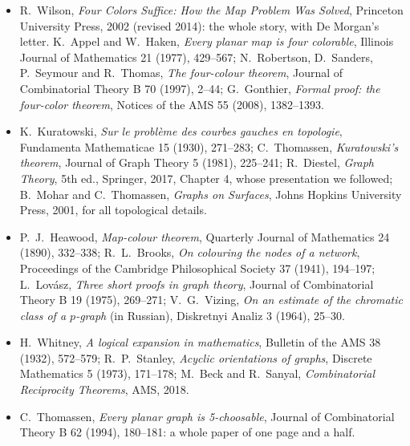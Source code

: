 \begin{itemize}
\item R.~Wilson, \emph{Four Colors Suffice: How the Map Problem Was Solved}, Princeton University Press, 2002 (revised 2014): the whole story,
with De Morgan's letter. K.~Appel and W.~Haken, \emph{Every planar map is four colorable}, Illinois Journal of Mathematics 21 (1977), 429--567;
N.~Robertson, D.~Sanders, P.~Seymour and R.~Thomas, \emph{The four-colour theorem}, Journal of Combinatorial Theory B 70 (1997), 2--44; G.~Gonthier,
\emph{Formal proof: the four-color theorem}, Notices of the AMS 55 (2008), 1382--1393.
\item K.~Kuratowski, \emph{Sur le probl\`eme des courbes gauches en topologie}, Fundamenta Mathematicae 15 (1930), 271--283; C.~Thomassen, \emph{Kuratowski's
theorem}, Journal of Graph Theory 5 (1981), 225--241; R.~Diestel, \emph{Graph Theory}, 5th ed., Springer, 2017, Chapter 4, whose presentation we
followed; B.~Mohar and C.~Thomassen, \emph{Graphs on Surfaces}, Johns Hopkins University Press, 2001, for all topological details.
\item P.~J.~Heawood, \emph{Map-colour theorem}, Quarterly Journal of Mathematics 24 (1890), 332--338; R.~L.~Brooks, \emph{On colouring the nodes of a
network}, Proceedings of the Cambridge Philosophical Society 37 (1941), 194--197; L.~Lov\'asz, \emph{Three short proofs in graph theory}, Journal of
Combinatorial Theory B 19 (1975), 269--271; V.~G.~Vizing, \emph{On an estimate of the chromatic class of a $p$-graph} (in Russian), Diskretnyi Analiz 3
(1964), 25--30.
\item H.~Whitney, \emph{A logical expansion in mathematics}, Bulletin of the AMS 38 (1932), 572--579; R.~P.~Stanley, \emph{Acyclic orientations of graphs},
Discrete Mathematics 5 (1973), 171--178; M.~Beck and R.~Sanyal, \emph{Combinatorial Reciprocity Theorems}, AMS, 2018.
\item C.~Thomassen, \emph{Every planar graph is 5-choosable}, Journal of Combinatorial Theory B 62 (1994), 180--181: a whole paper of one page and a half.
\end{itemize}
